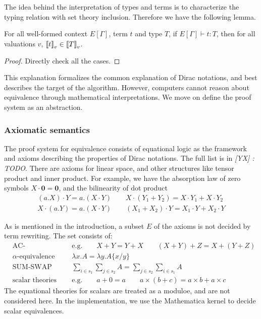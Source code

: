 \documentclass[runningheads]{llncs}
\newcommand{\yx}[1]{\textit{\color{blue}[YX] : #1}}
\begin{document}
The idea behind the interpretation of types and terms is to characterize the typing relation with set theory inclusion. Therefore we have the following lemma.
\begin{lemma}
    For all well-formed context $E[\Gamma]$, term $t$ and type $T$, if $E[\Gamma]\vdash t : T$, then for all valuations $v$, ${\llbracket t \rrbracket}_v \in {\llbracket T \rrbracket}_v$.
\end{lemma}
\begin{proof}
    Directly check all the cases.
\end{proof}

This explanation formalizes the common explanation of Dirac notations, and best describes the target of the algorithm.
However, computers cannot reason about equivalence through mathematical interpretations. We move on define the proof system as an abstraction.


\subsubsection{Axiomatic semantics} 
The proof system for equivalence consists of equational logic as the framework and axioms describing the properties of Dirac notations.
The full list is in \yx{TODO}.
There are axioms for linear space, and other structures like tensor product and inner product.
For example, we have the absorption law of zero symbols $X \cdot \mathbf{0} = \mathbf{0}$, and the bilinearity of dot product
\begin{align*}
    (a.X) \cdot Y = a.(X \cdot Y) \qquad X \cdot (Y_1 + Y_2) = X \cdot Y_1 + X \cdot Y_2 \\
    X \cdot (a.Y) = a.(X \cdot Y) \qquad (X_1 + X_2) \cdot Y = X_1 \cdot Y + X_2 \cdot Y
\end{align*}

As is mentioned in the introduction, a subset $E$ of the axioms is not decided by term rewriting. The set consists of:
\begin{align*}
    & \textrm{AC-equivalence} 
    && \textrm{e.g.} \qquad X + Y = Y + X \qquad (X + Y) + Z = X + (Y + Z) \\
    & \textrm{$\alpha$-equivalence}
    && \lambda x . A = \lambda y . A\{x/y\} \\
    & \textrm{SUM-SWAP}
    && \sum_{i \in s_1} \sum_{j \in s_2} A = \sum_{j \in s_2} \sum_{i \in s_1} A \\
    & \textrm{scalar theories} 
    && \textrm{e.g.} \qquad a + 0 = a \qquad a \times (b + c) = a \times b + a \times c
\end{align*}
The equational theories for scalars are treated as a moduloe, and are not considered here. In the implementation, we use the Mathematica kernel to decide scalar equivalences.
\end{document}
